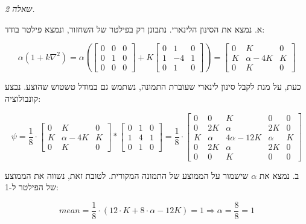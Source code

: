 \documentclass[a4paper]{iacas}
\begin{document}
\newpage
\begin{hebrew}
\textit{\huge שאלה 2.}

א. נמצא את הסינון הלינארי. נתבונן רק בפילטר של השחזור, ונמצא פילטר בודד:
\end{hebrew}
\begin{equation*}
\alpha(1+k\nabla^2) = \alpha\left(\begin{bmatrix}0&0&0\\0&1&0\\0&0&0\end{bmatrix}+K\begin{bmatrix}0&1&0\\1&-4&1\\0&1&0\end{bmatrix}\right) = \begin{bmatrix}0&K&0\\K&\alpha-4K&K\\0&K&0\end{bmatrix}
\end{equation*}
\begin{hebrew}
כעת, על מנת לקבל סינון לינארי שעוברת התמונה, נשתמש גם במודל טשטוש שהוצע. נבצע קונבולוציה:
\end{hebrew}
\begin{equation*}
\psi = \frac{1}{8}\cdot \begin{bmatrix}0&K&0\\K&\alpha-4K&K\\0&K&0\end{bmatrix} * \begin{bmatrix}0&1&0\\1&4&1\\0&1&0\end{bmatrix}  = \frac{1}{8} \cdot \begin{bmatrix}0&0&K&0&0\\0&2K&\alpha&2K&0\\K&\alpha&4\alpha-12K&\alpha&K\\0&2K&\alpha&2K&0\\0&0&K&0&0\end{bmatrix}
\end{equation*}

\begin{hebrew}
ב. נמצא את $\alpha$ שישמור על הממוצע של התמונה המקורית. לטובת זאת, נשווה את הממוצע של הפילטר ל-1:
\end{hebrew}

\begin{equation*}
mean = \frac{1}{8} \cdot (12\cdot K + 8\cdot\alpha - 12K) = 1  \Longrightarrow  \alpha = \frac{8}{8} = 1
\end{equation*}
\end{document}
